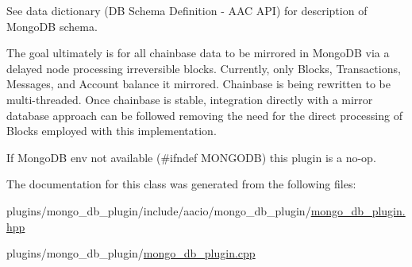 See data dictionary (DB Schema Definition -\/ A\+AC A\+PI) for description of Mongo\+DB schema.

The goal ultimately is for all chainbase data to be mirrored in Mongo\+DB via a delayed node processing irreversible blocks. Currently, only Blocks, Transactions, Messages, and Account balance it mirrored. Chainbase is being rewritten to be multi-\/threaded. Once chainbase is stable, integration directly with a mirror database approach can be followed removing the need for the direct processing of Blocks employed with this implementation.

If Mongo\+DB env not available (\#ifndef M\+O\+N\+G\+O\+DB) this plugin is a no-\/op. 

The documentation for this class was generated from the following files\+:\begin{DoxyCompactItemize}
\item 
plugins/mongo\+\_\+db\+\_\+plugin/include/aacio/mongo\+\_\+db\+\_\+plugin/\mbox{\hyperlink{mongo__db__plugin_8hpp}{mongo\+\_\+db\+\_\+plugin.\+hpp}}\item 
plugins/mongo\+\_\+db\+\_\+plugin/\mbox{\hyperlink{mongo__db__plugin_8cpp}{mongo\+\_\+db\+\_\+plugin.\+cpp}}\end{DoxyCompactItemize}
